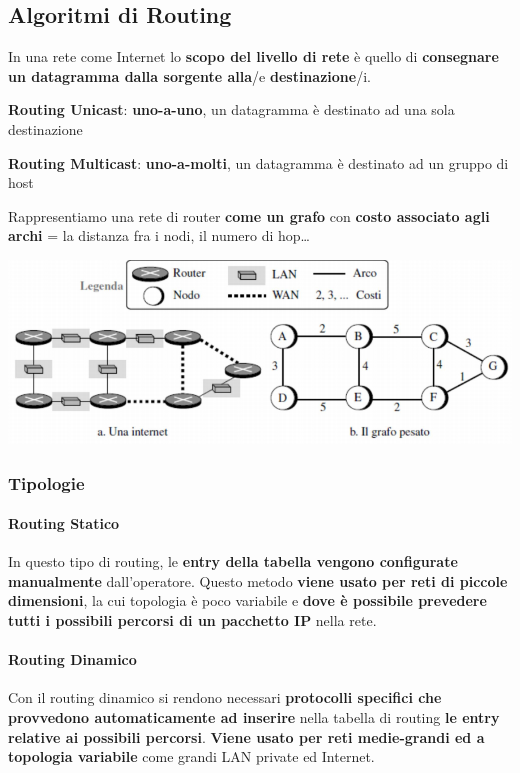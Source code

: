 \documentclass[10pt]{article}
\begin{document}
\subsection{Algoritmi di Routing}
In una rete come Internet lo \textbf{scopo del livello di rete} è quello di \textbf{consegnare un datagramma dalla sorgente alla}/e \textbf{destinazione}/i.
\begin{list}{}{}
\item \textbf{Routing Unicast}: \textbf{uno-a-uno}, un datagramma è destinato ad una sola destinazione
\item \textbf{Routing Multicast}: \textbf{uno-a-molti}, un datagramma è destinato ad un gruppo di host
\end{list}
Rappresentiamo una rete di router \textbf{come un grafo} con \textbf{costo associato agli archi} = la distanza fra i nodi, il numero di hop\ldots
\begin{center}
\includegraphics[scale=0.7]{routergrafo.png}
\end{center}
\pagebreak
\subsubsection{Tipologie}
\paragraph{Routing Statico} In questo tipo di routing, le \textbf{entry della tabella vengono configurate manualmente} dall'operatore. Questo metodo \textbf{viene usato per reti di piccole dimensioni}, la cui topologia è poco variabile e \textbf{dove è possibile prevedere tutti i possibili percorsi di un pacchetto IP} nella rete.
\paragraph{Routing Dinamico} Con il routing dinamico si rendono necessari \textbf{protocolli specifici che provvedono automaticamente ad inserire} nella tabella di routing \textbf{le entry relative ai possibili percorsi}. \textbf{Viene usato per reti medie-grandi ed a topologia variabile} come grandi LAN private ed Internet.
\end{document}
